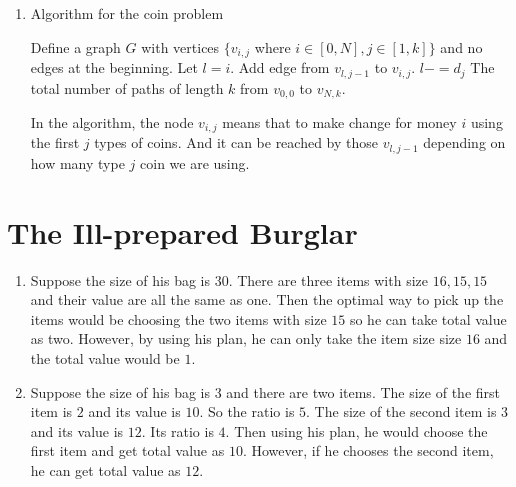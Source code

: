 \documentclass{article}
\begin{document}
\begin{enumerate}
			\item \begin{algorithm}[H]
				\caption{Algorithm for the coin problem}
				\begin{algorithmic}
					\State Define a graph $G$ with vertices $\{v_{i, j}$ where $ i \in [0, N], j\in [1, k]\}$ and no edges at the beginning.
					\State {}
							\State Let $l = i$.
							\State \While { $l \geq 0$}
								\State Add edge from $v_{l, j - 1}$ to $v_{i, j}$.
								\State $l -= d_j$
							\EndWhile
						\EndFor
					\EndFor
					\State \Return The total number of paths of length $k$ from $v_{0, 0}$ to $v_{N, k}$.
				\end{algorithmic}
			\end{algorithm}
			In the algorithm, the node $v_{i, j}$ means that to make change for money $i$ using the first $j$ types of coins. And it can be reached by those $v_{l, j - 1}$ depending on how many type $j$ coin we are using.
		\end{enumerate}

	\section{The Ill-prepared Burglar}
		\begin{enumerate}
			\item Suppose the size of his bag is $30$. There are three items with size $16, 15, 15$ and their value are all the same as one. Then the optimal way to pick up the items would be choosing the two items with size $15$ so he can take total value as two. However, by using his plan, he can only take the item size size $16$ and the total value would be $1$.
			\item Suppose the size of his bag is $3$ and there are two items. The size of the first item is $2$ and its value is $10$. So the ratio is $5$. The size of the second item is $3$ and its value is $12$. Its ratio is $4$. Then using his plan, he would choose the first item and get total value as $10$. However, if he chooses the second item, he can get total value as $12$.
		\end{enumerate}
\end{document}
